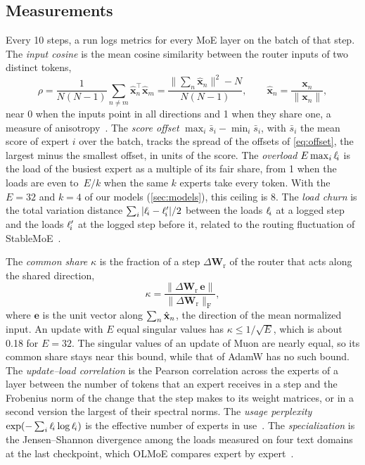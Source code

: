 \documentclass[11pt, a4paper]{article}
\newcommand{\load}[1]{\ell_{\mkern-3mu #1}} %
\newcommand{\vx}{\mathbf{x}}
\newcommand{\Wr}{\mathbf{W}_{\mathrm{r}}}
\begin{document}
\subsection{Measurements}
\label{sec:measurements}

Every 10 steps, a run logs metrics for every MoE layer on the batch of that step. The \emph{input cosine} is the mean cosine similarity between the router inputs of two distinct tokens,
\begin{equation*}
  \rho = \frac{1}{N(N-1)} \sum_{n \neq m} \hat{\vx}_n^{\top} \hat{\vx}_m = \frac{\lVert \sum_{n} \hat{\vx}_n \rVert^2 - N}{N(N-1)}, \qquad \hat{\vx}_n = \frac{\vx_n}{\lVert \vx_n \rVert},
\end{equation*}
near 0 when the inputs point in all directions and 1 when they share one, a measure of anisotropy~\citep{ethayarajh2019contextual}. The \emph{score offset} ${\max_i \bar{s}_i - \min_i \bar{s}_i}$, with $\bar{s}_i$ the mean score of expert $i$ over the batch, tracks the spread of the offsets of \cref{eq:offset}, the largest minus the smallest offset, in units of the score. The \emph{overload} $E \max_i \load{i}$ is the load of the busiest expert as a multiple of its fair share, from 1 when the loads are even to~$E/k$ when the same $k$ experts take every token. With the $E = 32$ and $k = 4$ of our models (\cref{sec:models}), this ceiling is 8. The \emph{load churn} is the total variation distance $\sum_i\, \lvert \load{i} - \ell'_{\mkern-3mu i} \rvert / 2$ between the loads $\load{i}$ at a logged step and the loads $\ell'_{\mkern-3mu i}$ at the logged step before it, related to the routing fluctuation of StableMoE~\citep{dai2022stablemoe}.

The \emph{common share} $\kappa$ is the fraction of a step $\Delta \Wr$ of the router that acts along the shared direction,
\begin{equation*}
  \kappa = \frac{\lVert \Delta \Wr \, \mathbf{e} \rVert}{\lVert \Delta \Wr \rVert_{\mathrm{F}}},
\end{equation*}
where $\mathbf{e}$ is the unit vector along $\smash[b]{\sum_n \hat{\vx}_n}$, the direction of the mean normalized input. An update with $E$ equal singular values has $\kappa \leq 1/\sqrt{E}$, which is about 0.18 for $E = 32$. The singular values of an update of Muon are nearly equal, so its common share stays near this bound, while that of AdamW has no such bound. The \emph{update--load correlation} is the Pearson correlation across the experts of a layer between the number of tokens that an expert receives in a step and the Frobenius norm of the change that the step makes to its weight matrices, or in a second version the largest of their spectral norms. The \emph{usage perplexity} $\exp(-\sum_i \load{i} \log \load{i})$ is the effective number of experts in use~\citep{wang2026depth}. The \emph{specialization} is the Jensen--Shannon divergence among the loads measured on four text domains at the last checkpoint, which OLMoE compares expert by expert~\citep{muennighoff2025olmoe}.
\end{document}
